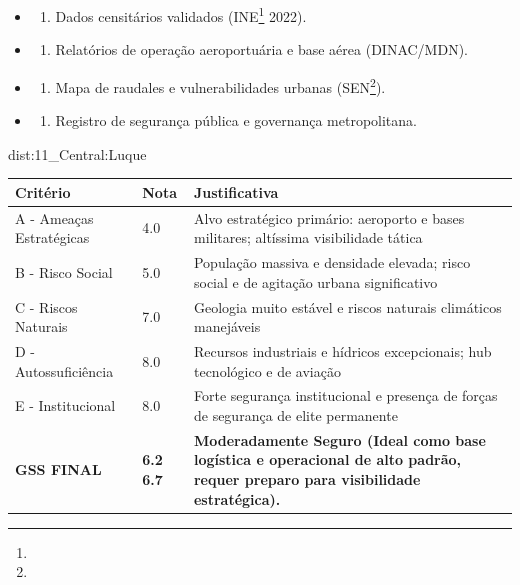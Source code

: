 {\begin{itemize}
\tightlist
\item
  \begin{enumerate}
  \def\labelenumi{\arabic{enumi})}
  \tightlist
  \item
    Dados censitários validados (INE\footnote{\fineINE} 2022).
  \end{enumerate}
\item
  \begin{enumerate}
  \def\labelenumi{\arabic{enumi})}
  \setcounter{enumi}{1}
  \tightlist
  \item
    Relatórios de operação aeroportuária e base aérea (DINAC/\allowbreak MDN).
  \end{enumerate}
\item
  \begin{enumerate}
  \def\labelenumi{\arabic{enumi})}
  \setcounter{enumi}{2}
  \tightlist
  \item
    Mapa de raudales e vulnerabilidades urbanas (SEN\footnote{\fineSEN}).
  \end{enumerate}
\item
  \begin{enumerate}
  \def\labelenumi{\arabic{enumi})}
  \setcounter{enumi}{3}
  \tightlist
  \item
    Registro de segurança pública e governança metropolitana.
  \end{enumerate}
\end{itemize}}{dist:11_Central:Luque}
\begin{table}[ht!]
\small \begin{tabular}{p{3.0cm}p{0.8cm}p{6.0cm}} \toprule
\textbf{Critério} & \textbf{Nota} & \textbf{Justificativa} \\ \midrule
A - Ameaças Estratégicas & 4.0 & Alvo estratégico primário: aeroporto e bases militares; altíssima visibilidade tática \\
B - Risco Social & 5.0 & População massiva e densidade elevada; risco social e de agitação urbana significativo \\
C - Riscos Naturais & 7.0 & Geologia muito estável e riscos naturais climáticos manejáveis \\
D - Autossuficiência & 8.0 & Recursos industriais e hídricos excepcionais; hub tecnológico e de aviação \\
E - Institucional & 8.0 & Forte segurança institucional e presença de forças de segurança de elite permanente \\
\midrule \textbf{GSS FINAL} & \textbf{6.2
6.7} & \textbf{Moderadamente Seguro (Ideal como base logística e operacional de alto padrão, requer preparo para visibilidade estratégica).} \\ \bottomrule \end{tabular}
\end{table}

